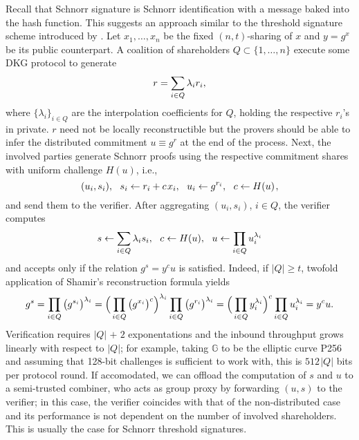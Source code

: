 \documentclass{iacrtrans}
\begin{document}
Recall that Schnorr signature is
Schnorr identification with a message baked
into the hash function.
This suggests an approach similar to the
threshold signature scheme introduced
by \cite{paper_stinson_strobl}.
Let $x_1, \dots, x_n$ be the fixed
$(n,t)$-sharing of $x$ and $y = g ^ x$ be its public counterpart.
A coalition of shareholders $Q \subset \{1, \dots, n\}$
execute some DKG protocol to generate
\vspace{5pt}
\begin{equation*}
r = \sum_{i \in Q} \lambda_i r_i,
\vspace{5pt}
\end{equation*}
where $\{\lambda_i\}_{i \in Q}$
are the interpolation coefficients
for $Q$, holding the respective $r_i$'s in private.
$r$ need not be locally reconstructible
but the provers should be able to
infer the distributed commitment
$u \equiv g^r$ at the end of the process.
Next, the involved parties generate Schnorr proofs
using the respective commitment shares with uniform challenge $H(u)$, i.e.,
\vspace{5pt}
\begin{equation*}
(u_i, s_i),
\ \ s_i \leftarrow r_i + c\hspace{1pt}x_i,
\ \ u_i \leftarrow g ^ {r_i},
\ \ c \leftarrow H(u)
\hspace{1pt},
\vspace{5pt}
\end{equation*}
and send them to the verifier. 
After aggregating $(u_i, s_i)$, $i \in Q$,
the verifier computes
\vspace{5pt}
\begin{equation*}
s \leftarrow \sum_{i \in Q} \lambda_i s_i,
\ \ c \leftarrow H(u),
\ \ u \leftarrow \prod_{i \in Q} u_i ^ {\lambda_i}
\vspace{5pt}
\end{equation*}
and accepts only if the relation
$g ^ s = y ^ c u$ is satisfied.
Indeed, if $|Q| \ge t$,
twofold application of Shamir's reconstruction formula yields
\vspace{5pt}
\begin{equation*}
g ^ s =
\prod_{i \in Q} \big(g ^ {s_i}\big)^{\lambda_i} =
\Big(\prod_{i \in Q}\big(g ^ {x_i}\big)^c\Big)^{\lambda_i} \prod_{i \in Q}\big(g ^ {r_i}\big) ^ {\lambda_i} =
\Big(\prod_{i \in Q}y_i^{\lambda_i}\Big)^c \prod_{i \in Q}u_i^{\lambda_i}=
y^c u.
\vspace{5pt}
\end{equation*}
Verification requires $|Q|\hspace{1pt} +\hspace{1pt} 2$
exponentations and the inbound throughput grows linearly
with respect to $|Q|$; for example,
taking $\mathbb{G}$ to be the elliptic curve P256
and assuming that 128-bit challenges is sufficient to work with,
this is $512 \hspace{1pt} |Q|$ bits per protocol
round. If accomodated, we can offload the computation of $s$ and $u$
to a semi-trusted combiner,
who acts as group proxy by forwarding $(u, s)$ to the verifier;
in this case, the verifier coincides with that of the
non-distributed case and its performance
is not dependent on the number of involved shareholders.
This is usually the case for Schnorr threshold signatures.
\end{document}
